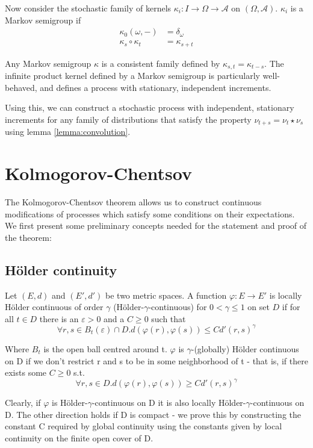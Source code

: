 \documentclass[orivec, envcountsame]{llncs}
\begin{document}
Now consider the stochastic family of kernels \(\kappa_i : I \to \Omega\to \mathcal{A}\) on \((\Omega, \mathcal{A})\). \(\kappa_i\) is a Markov semigroup if
\begin{align*}
    \kappa_0(\omega, -) &= \delta_\omega\\
    \kappa_s \circ \kappa_t &= \kappa_{s+t}
\end{align*}

Any Markov semigroup \(\kappa\) is a consistent family defined by \(\kappa_{s,t} = \kappa_{t-s}\). The infinite product kernel defined by a Markov semigroup is particularly well-behaved, and defines a process with stationary, independent increments.

Using this, we can construct a stochastic process with independent, stationary increments for any family of distributions that satisfy the property \(\nu_{t+s} = \nu_t \star \nu_s\) using lemma \ref{lemma:convolution}.

\section{Kolmogorov-Chentsov}\label{sec:modification}
The Kolmogorov-Chentsov theorem allows us to construct continuous modifications of processes which satisfy some conditions on their expectations. We first present some preliminary concepts needed for the statement and proof of the theorem:

\subsection{H{\"o}lder continuity}
Let \((E, d)\) and \((E', d')\) be two metric spaces. A function \(\varphi: E \to E'\) is locally H{\"o}lder continuous of order \(\gamma\) (H{\"o}lder-\(\gamma\)-continuous) for \(0 < \gamma \le 1\) on set \(D\) if for all \(t \in D\) there is an \(\varepsilon > 0\) and a \(C \ge 0\) such that
\[\forall r, s \in B_t(\varepsilon)\cap D. d(\varphi(r), \varphi(s)) \le  C d'(r,s)^\gamma\]

Where \(B_t\) is the open ball centred around t. \(\varphi\) is \(\gamma\)-(globally) H{\"o}lder continuous on D if we don't restrict r and s to be in some neighborhood of t - that is, if there exists some \(C \ge 0\) s.t.
\[\forall r, s \in D. d(\varphi(r), \varphi(s)) \ge C d'(r,s)^\gamma\]

Clearly, if \(\varphi\) is H{\"o}lder-\(\gamma\)-continuous on D it is also locally H{\"o}lder-\(\gamma\)-continuous on D. The other direction holds if D is compact - we prove this by constructing the constant C required by global continuity using the constants given by local continuity on the finite open cover of D.
\end{document}
